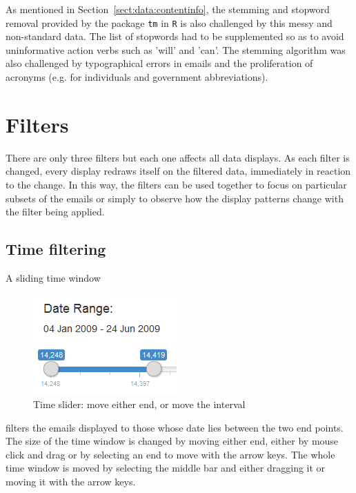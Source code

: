 \documentclass[journal]{vgtc}                %
\begin{document}
As mentioned in Section~\ref{sect:data:contentinfo}, the stemming and stopword removal provided by the package \texttt{tm} in \texttt{R} is also challenged by this messy and non-standard data. The list of stopwords had to be supplemented so as to avoid uninformative action verbs such as 'will' and 'can'. The stemming algorithm was also challenged by typographical errors in emails and the proliferation of acronyms (e.g. for individuals and government abbreviations).   

\section{Filters}
\label{sect:Filters}
There are only three filters but each one affects all data displays.  As each filter is changed, every display redraws itself on the filtered data, immediately in reaction to the change.  In this way, the filters can be used together to focus on particular subsets of the emails or simply to observe how the display patterns change with the filter being applied.
\subsection{Time filtering}
A sliding time window 
\begin{figure}[h]
\begin{center}
\includegraphics[width=0.35\linewidth]{DateSliderImage}
\caption{Time slider: move either end, or move the interval}
\end{center}
\label{fig:timeSlider}
\end{figure}
filters the emails displayed to those whose date lies between the two end points.
The size of the time window is changed by  moving either end, either by mouse click and drag or by selecting an end to move with the arrow keys. The whole time window is moved by selecting the middle bar and either dragging it or moving it with the arrow keys.
\end{document}
